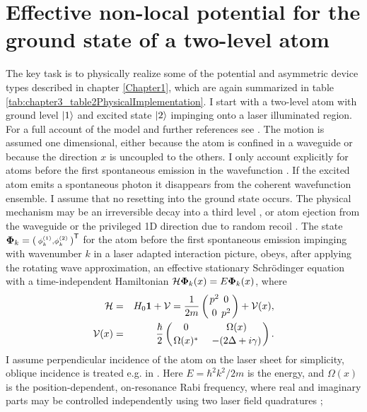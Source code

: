 %
\section{Effective non-local potential for the ground state of a two-level atom\label{enl}}
%
The key task is to physically realize some of the potential and asymmetric device types described in chapter \ref{Chapter1}, which are again summarized in table \ref{tab:chapter3_table2PhysicalImplementation}. I start with a two-level atom with ground level $\ket{1}$ and excited state $\ket{2}$ impinging onto a laser illuminated region. For a full account of the model and further references see
\cite{Ruschhaupt2009}. The motion is assumed one dimensional, either because the atom is confined in a waveguide or because the direction $x$ is uncoupled to
the others.
I only account explicitly for atoms before the first spontaneous emission in the wavefunction
\cite{Hegerfeldt1996,Damborenea2002,Navarro2003}.
If the excited atom emits a spontaneous photon it disappears from the coherent wavefunction ensemble.
I assume that no resetting into the ground state occurs. The physical mechanism
may be an irreversible decay into a third level  \cite{Oberthaler1996}, or atom ejection from the waveguide or the privileged 1D direction due to  random recoil  \cite{Streed2006}.
The state ${\bf\Phi}_k=\left(\begin{smallmatrix}\phi_k^{(1)},\phi_k^{(2)}\end{smallmatrix}\right)^{\sf T}$
for the atom before the first spontaneous emission impinging with wavenumber $k$
in a laser adapted  interaction picture,
obeys, after applying the rotating wave approximation, an effective stationary Schr\"{o}dinger equation
with a time-independent Hamiltonian \cite{Ruschhaupt2004a,Ruschhaupt2009}
%
${\cal H}{\bf\Phi}_k(x)=E{\bf\Phi}_k(x)$,
%
where
%
\begin{eqnarray}
  {\cal H}&=& H_0{\bf 1}+ {\cal V}=\frac{1}{2m}\left(
  {{p}^2\atop 0}{0\atop {p}^2}\right)+ {\cal V}(x),
  \\
  {\cal V}(x) &=&
  \frac{\hbar}{2}\left(
  {0\atop \Omega(x)^*}\;\;\;\;
  {\Omega(x)\atop -(2\Delta+i\gamma)}
  \right).
\end{eqnarray}
%
I assume perpendicular incidence of the atom on the laser sheet for simplicity, oblique incidence is treated e.g. in  \cite{Ruschhaupt2007,Ruschhaupt2009}.
Here $E=\hbar^2 k^2/2m$ is the energy, and
$\Omega(x)$ is the position-dependent, on-resonance Rabi frequency, where real and imaginary parts may be controlled independently
using two  laser field quadratures  \cite{Zhang2013};

